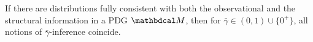 \documentclass{article}
\newcommand\zogamma{{\bar\gamma}}
\newcommand\otodo[2][]{\todo[color=olicolor!30!white,#1]{#2}}
\begin{document}
If there are distributions
fully
consistent with
both the observational and the structural information
in a PDG $\dg M$, 
then for $\zogamma \in (0,1) \cup \{0^+\}$, all
notions of $\zogamma$-inference 
coincide.
\end{document}
